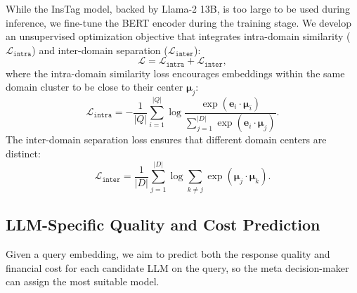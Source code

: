 While the InsTag model, backed by Llama-2 13B, is too large to be used during inference, we fine-tune the BERT encoder during the training stage.
We develop an unsupervised optimization objective that integrates intra-domain similarity ($\mathcal{L}_{\texttt{intra}}$) and inter-domain separation ($\mathcal{L}_{\texttt{inter}}$):
\begin{equation} \label{total_loss}
    \mathcal{L} = \mathcal{L}_{\texttt{intra}} + \mathcal{L}_{\texttt{inter}},
\end{equation}
where the intra-domain similarity loss encourages embeddings within the same domain cluster to be close to their center $\boldsymbol{\mu}_j$:
\begin{equation} \label{variation_loss}
    \mathcal{L}_{\texttt{intra}} = -\frac{1}{|Q|} \sum_{i=1}^{|Q|} \log \frac{\exp(\mathbf{e}_i \cdot \boldsymbol{\mu}_{i})}{\sum_{j=1}^{|D|} \exp(\mathbf{e}_i \cdot \boldsymbol{\mu}_j)}.
\end{equation}
The inter-domain separation loss ensures that different domain centers are distinct:
\begin{equation} \label{separation_loss}
    \mathcal{L}_{\texttt{inter}} = \frac{1}{|D|} \sum_{j=1}^{|D|} \log \sum_{k \neq j} \exp(\boldsymbol{\mu}_j \cdot \boldsymbol{\mu}_k).
\end{equation}


\subsection{LLM-Specific Quality and Cost Prediction}
Given a query embedding, we aim to predict both the response quality and financial cost for each candidate LLM on the query, so the meta decision-maker can assign the most suitable model.


